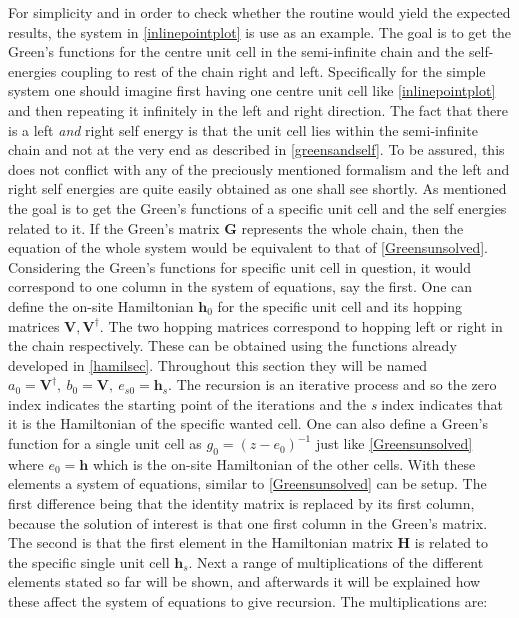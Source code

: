 For simplicity and in order to check whether the routine would yield the expected results, the system in \cref{inlinepointplot} is use as an example. The goal is to get the Green's functions for the centre unit cell in the semi-infinite chain and the self-energies coupling to rest of the chain right and left. Specifically for the simple system one should imagine first having one centre unit cell like \cref{inlinepointplot} and then repeating it infinitely in the left and right direction. The fact that there is a left \textit{and} right self energy is that the unit cell lies within the semi-infinite chain and not at the very end as described in \cref{greensandself}. To be assured, this does not conflict with any of the preciously mentioned formalism and the left and right self energies are quite easily obtained as one shall see shortly. As mentioned the goal is to get the Green's functions of a specific unit cell and the self energies related to it. If the Green's matrix \(\mathbf{G}\) represents the whole chain, then the equation of the whole system would be equivalent to that of \cref{Greensunsolved}. Considering the Green's functions for specific unit cell in question, it would correspond to one column in the system of equations, say the first. One can define the on-site Hamiltonian \(\mathbf{h}_0\) for the specific unit cell and its hopping matrices \(\mathbf{V},\mathbf{V}^{\dagger}\).  The two hopping matrices correspond to hopping left or right in the chain respectively. These can be obtained using the functions already developed in \cref{hamilsec}. Throughout this section they will be named \(a_0 = \mathbf{V}^{\dagger}, \ b_0 = \mathbf{V}, \ e_{s0} = \mathbf{h}_{s}\). The recursion is an iterative process and so the zero index indicates the starting point of the iterations and the \textit{s} index indicates that it is the Hamiltonian of the specific wanted cell. One can also define a Green's function for a single unit cell as \(g_0 = (z-e_{0})^{-1}\) just like \cref{Greensunsolved} where \(e_{0}=\mathbf{h}\) which is the on-site Hamiltonian of the other cells. With these elements a system of equations, similar to \cref{Greensunsolved} can be setup. The first difference being that the identity matrix is replaced by its first column, because the solution of interest is that one first column in the Green's matrix. The second is that the first element in the Hamiltonian matrix \(\mathbf{H}\) is related to the specific single unit cell \(\mathbf{h}_s\). Next a range of multiplications of the different elements stated so far will be shown, and afterwards it will be explained how these affect the system of equations to give recursion. The multiplications are:
